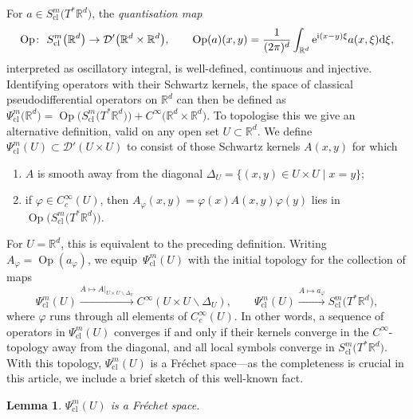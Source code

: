 \documentclass[pdftex]{sigma}
\numberwithin{equation}{section}
\newtheorem{Lemma}[Theorem]{Lemma}
\theoremstyle{definition}
\newcommand{\R}{\mathbb{R}} %
\newcommand{\1}{{\bf 1}}
\DeclareMathOperator{\Op}{Op}
\newcommand{\cl}{\mathrm{cl}}
\begin{document}
For $a\in S^m_\cl\bigl(T^*\R^d\bigr)$, the {\it quantisation map}
\[
	\Op\colon\ S^m_\cl\bigl(\R^d\bigr)\rightarrow \mathcal D'\bigl(\R^d\times \R^d\bigr),\qquad \Op(a)(x,y)=
	\frac 1{(2\pi)^d} \int_{\R^d}{\rm e}^{{\rm i}(x-y)\xi}a(x,\xi) {{\rm d}\xi},
\]	
interpreted as oscillatory integral, is well-defined, continuous and injective. Identifying operators with their Schwartz kernels, the space of classical pseudodifferential operators on $\R^d$ can then be defined as
$\Psi^m_\cl\bigl(\R^d\bigr) = \Op\bigl(S^m_\cl\bigl(T^*\R^d\bigr)\bigr) + C^\infty\bigl(\R^d\times \R^d\bigr)$.
To topologise this we give an alternative definition, valid on any open set $U\subset \R^d$. We define $\Psi^m_\cl(U)\subset \mathcal D'(U\times U)$ to consist of those Schwartz kernels $A(x,y)$ for which
\begin{enumerate}[label=(\alph*)]\itemsep=0pt
	\item $A$ is smooth away from the diagonal $\Delta_U=\{(x,y)\in U\times U\mid x=y\}$;
	
	\item if $\varphi \in C_c^\infty(U)$, then $A_\varphi(x,y)=\varphi(x)A(x,y)\varphi(y)$ lies in $\Op\bigl(S^m_\cl\bigl(T^*\R^d\bigr)\bigr)$.
\end{enumerate}
For $U=\R^d$, this is equivalent to the preceding definition.
Writing $A_\varphi=\Op(a_\varphi)$, we equip~$\Psi^m_\cl(U)$ with the initial topology for the collection of maps
\begin{equation}\label{toppsido}
	\Psi^m_\cl(U)\xrightarrow{A\mapsto A\vert_{U\times U\backslash \Delta_U}} C^\infty(U\times U\backslash \Delta_U),\qquad \Psi^m_\cl(U)\xrightarrow{A\mapsto a_\varphi} S^m_\cl\bigl(T^*\R^d\bigr),
\end{equation}
where $\varphi$ runs through all elements of $C_c^\infty(U)$. In other words, a sequence of operators in $\Psi^m_\cl(U)$ converges if and only if their kernels converge in the $C^\infty$-topology away from the diagonal, and all local symbols converge in $S^m_\cl\bigl(T^*\R^d\bigr)$.
With this topology, $\Psi^m_\cl(U)$ is a Fr{\'e}chet space---as the completeness is crucial in this article, we include a brief sketch of this well-known fact.

\begin{Lemma}
	$\Psi_\cl^m(U)$ is a Fr{\'e}chet space.
\end{Lemma}
\end{document}
